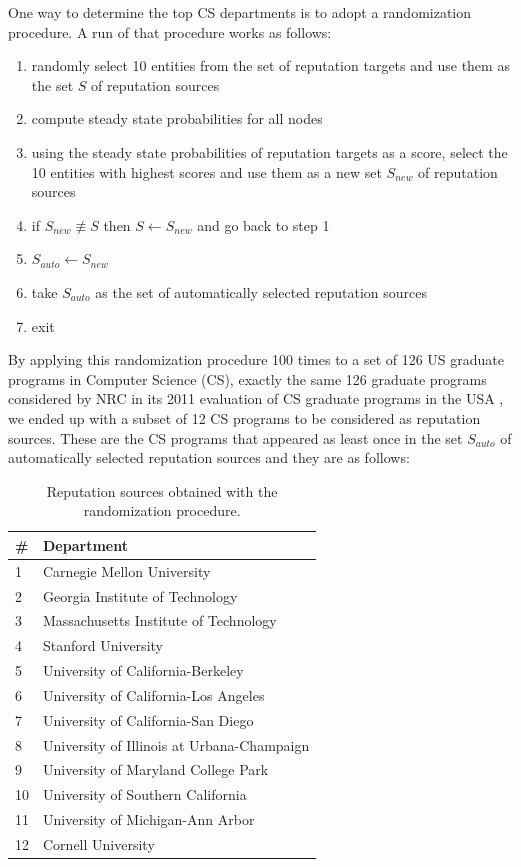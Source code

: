 \documentclass[man,floatsintext]{apa6}
\let\footnote\endnote
\begin{document}
One way to determine the top CS departments is to 
adopt a randomization procedure. A run of that 
procedure works as follows: 
\begin{enumerate}
\item randomly select 10 entities from the set of reputation targets and use them as the set $S$ of reputation sources
\item compute steady state probabilities for all nodes
\item using the steady state probabilities of reputation targets as a score, select the 10 entities with highest scores and use them as a new set $S_{new}$ of reputation sources
\item if $S_{new} \not \equiv S$ then $S \leftarrow S_{new}$ and go back to step 1
\item $S_{auto} \leftarrow S_{new}$ 
\item take $S_{auto}$ as the set of automatically selected reputation sources
\item exit
\end{enumerate}
By applying this randomization procedure 100 times to a set of 126 US graduate programs in Computer Science (CS), 
exactly the same 126 graduate programs considered by NRC in its 2011 evaluation of CS graduate programs 
in the USA \footnote{http://www.nap.edu/rdp/}, we ended up with a subset of 12 CS programs to be considered as reputation sources. 
These are the CS programs that appeared as least once in the set $S_{auto}$ of automatically selected reputation 
sources and they are as follows: 

\begin{table}[h!]
 \centering
 \begin{tabular}{l l} 
 \toprule
 \# & Department \\ 
 \midrule
 1  & Carnegie Mellon University \\
 2  & Georgia Institute of Technology \\
 3  & Massachusetts Institute of Technology \\
 4  & Stanford University \\
 5  & University of California-Berkeley \\
 6  & University of California-Los Angeles \\
 7  & University of California-San Diego \\
 8  & University of Illinois at Urbana-Champaign \\
 9  & University of Maryland College Park \\
 10 & University of Southern California \\
 11 & University of Michigan-Ann Arbor \\
 12 & Cornell University \\
 \bottomrule
 \end{tabular}
 \caption{Reputation sources obtained with the randomization procedure.}
 \label{tab:departments}
\end{table}
\end{document}
